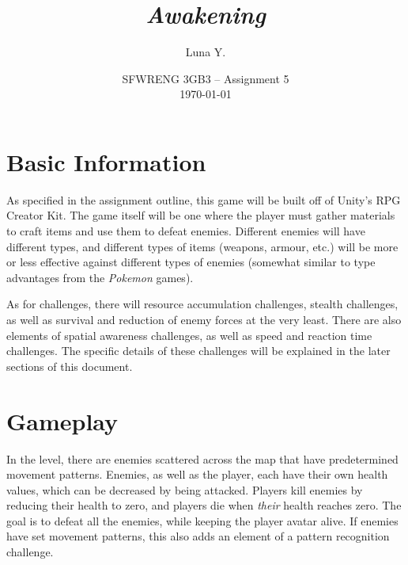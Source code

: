 \documentclass[10pt]{article}
\begin{document}
\title{\textit{Awakening}}
\author{Luna Y.}
\date{
    SFWRENG 3GB3 -- Assignment 5\\[0.25cm]
    \today
}
\maketitle

\tableofcontents

\section{Basic Information}

As specified in the assignment outline, this game will be built off of Unity's RPG Creator Kit.
The game itself will be one where the player must gather materials to craft items and use them to defeat enemies.
Different enemies will have different types, and different types of items (weapons, armour, etc.) will be more or
less effective against different types of enemies (somewhat similar to type advantages from the \textit{Pokemon} games).

As for challenges, there will resource accumulation challenges, stealth challenges, as well as survival and reduction of enemy forces
at the very least. There are also elements of spatial awareness challenges, as well as speed and reaction time challenges.
The specific details of these challenges will be explained in the later sections of this document.

\section{Gameplay}

In the level, there are enemies scattered across the map that have predetermined movement patterns. Enemies, as well
as the player, each have their own health values, which can be decreased by being attacked. Players kill enemies
by reducing their health to zero, and players die when \textit{their} health reaches zero. The goal is to defeat
all the enemies, while keeping the player avatar alive. If enemies have set movement patterns,
this also adds an element of a pattern recognition challenge.
\end{document}
